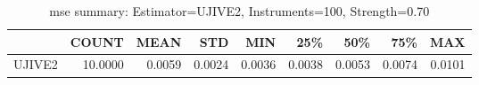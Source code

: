 \begin{table}[ht]
\centering
\caption{mse summary: Estimator=UJIVE2, Instruments=100, Strength=0.70}
\begin{tabular}{lrrrrrrrr}
\toprule
 & COUNT & MEAN & STD & MIN & 25\% & 50\% & 75\% & MAX \\
\midrule
UJIVE2 & 10.0000 & 0.0059 & 0.0024 & 0.0036 & 0.0038 & 0.0053 & 0.0074 & 0.0101 \\
\bottomrule
\end{tabular}
\end{table}
